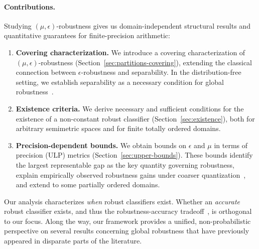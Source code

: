 \paragraph{Contributions.}
Studying $(\mu,\epsilon)$-robustness gives us domain-independent structural results and quantitative guarantees for finite-precision arithmetic:
\begin{enumerate}
\item \textbf{Covering characterization.}
We introduce a covering characterization of $(\mu,\epsilon)$-robustness (Section~\ref{sec:partitions-covering}), extending the classical connection between $\epsilon$-robustness and separability. In the distribution-free setting, we establish separability as a necessary condition for global robustness~\cite{yang2020closer,mangal2023certifying}.

\item \textbf{Existence criteria.}
We derive necessary and sufficient conditions for the existence of a non-constant robust classifier (Section~\ref{sec:existence}), both for arbitrary semimetric spaces and for finite totally ordered domains.

\item \textbf{Precision-dependent bounds.}
We obtain bounds on $\epsilon$ and $\mu$ in terms of precision (ULP) metrics (Section~\ref{sec:upper-bounds}). These bounds identify the largest representable gap as the key quantity governing robustness, explain empirically observed robustness gains under coarser quantization~\cite{xiao2023robustmq,shrestha2024properties,duncan2020relative}, and extend to some partially ordered domains.
\end{enumerate}
Our analysis characterizes \emph{when} robust classifiers exist. 
Whether an \emph{accurate} robust classifier exists, and thus the robustness-accuracy
tradeoff~\cite{zhang2019theoretically}, is orthogonal to our focus. 
Along the way, our framework provides a unified, non-probabilistic perspective on several results 
concerning global robustness that have previously appeared in disparate parts of the literature.

